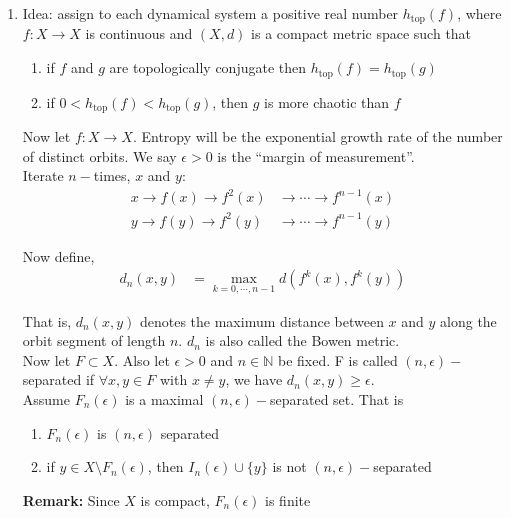\documentclass[12pt]{article}
\begin{document}
\begin{enumerate}[label=(\alph*)]

\item Idea: assign to each dynamical system a positive real number $h_{\text{top}}(f)$, where $f: X \to X$ is continuous and $(X, d)$ is a compact metric space such that
\begin{enumerate}[label=\roman*)]
\item if $f$ and $g$ are topologically conjugate then $h_{\text{top}}(f) = h_{\text{top}}(g)$
\item if $0 < h_{\text{top}}(f) < h_{\text{top}}(g)$, then $g$ is more chaotic than $f$
\end{enumerate}

Now let $f: X \to X$. Entropy will be the exponential growth rate of the number of distinct orbits. We say $\epsilon > 0$ is the ``margin of measurement''.\\

Iterate $n-$times, $x$ and $y$:
\begin{align*}
x \to f(x) \to f^2(x) &\to \cdots \to f^{n-1}(x)\\
y \to f(y) \to f^2(y) &\to \cdots \to f^{n-1}(y)
\end{align*}

Now define,
\begin{align*}
d_n(x,y) &= \max_{k = 0, \cdots, n-1} d(f^k(x), f^k(y))
\end{align*}

That is, $d_n(x, y)$ denotes the maximum distance between $x$ and $y$ along the orbit segment of length $n$. $d_n$ is also called the Bowen metric.\\

Now let $F \subset X$. Also let $\epsilon > 0$ and $n \in \mathbb{N}$ be fixed. F is called $(n, \epsilon)-$separated if $\forall x, y \in F$ with $x \neq y$, we have $d_n(x, y) \geq \epsilon$.\\

Assume $F_n(\epsilon)$ is a maximal $(n, \epsilon)-$separated set. That is
\begin{enumerate}[label = \roman*)]
\item $F_n(\epsilon)$ is $(n, \epsilon)$ separated
\item if $y \in X \setminus F_n(\epsilon)$, then $I_n(\epsilon) \cup \{y\}$ is not $(n, \epsilon)-$separated
\end{enumerate}

\textbf{Remark:} Since $X$ is compact, $F_n(\epsilon)$ is finite\\


\end{enumerate}
\end{document}

